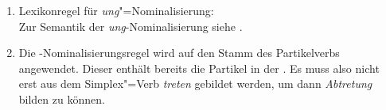 \begin{enumerate}

\item


\eas
\label{lr-ung-nom}%
Lexikonregel für \emph{ung}"=Nominalisierung:\\
\zs
Zur Semantik der \emph{ung}-Nominalisierung siehe .

\item Die -Nominalisierungsregel wird auf den Stamm des Partikelverbs angewendet. Dieser
  enthält bereits die Partikel in der \argstl. Es muss also nicht erst aus dem Simplex"=Verb
  \emph{treten}  gebildet werden, um dann \emph{Abtretung} bilden zu können.

\end{enumerate}
